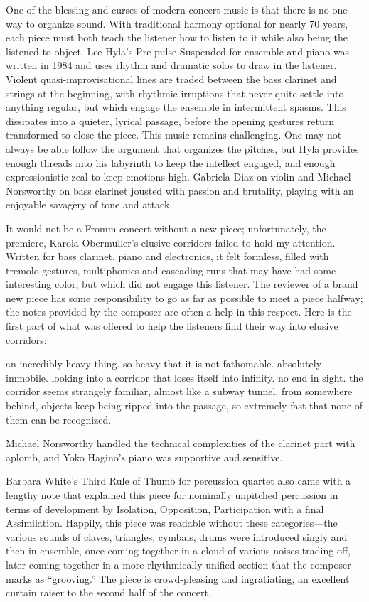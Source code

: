 One of the blessing and curses of modern concert music is that there is no one way to organize sound. With traditional harmony optional for nearly 70 years, each piece must both teach the listener how to listen to it while also being the listened-to object. Lee Hyla’s Pre-pulse Suspended for ensemble and piano was written in 1984 and uses rhythm and dramatic solos to draw in the listener. Violent quasi-improvisational lines are traded between the bass clarinet and strings at the beginning, with rhythmic irruptions that never quite settle into anything regular, but which engage the ensemble in intermittent spasms. This dissipates into a quieter, lyrical passage, before the opening gestures return transformed to close the piece. This music remains challenging. One may not always be able follow the argument that organizes the pitches, but Hyla provides enough threads into his labyrinth to keep the intellect engaged, and enough expressionistic zeal to keep emotions high. Gabriela Diaz on violin and Michael Norsworthy on bass clarinet jousted with passion and brutality, playing with an enjoyable savagery of tone and attack.

It would not be a Fromm concert without a new piece; unfortunately, the premiere, Karola Obermuller’s elusive corridors failed to hold my attention. Written for bass clarinet, piano and electronics, it felt formless, filled with tremolo gestures, multiphonics and cascading runs that may have had some interesting color, but which did not engage this listener. The reviewer of a brand new piece has some responsibility to go as far as possible to meet a piece halfway; the notes provided by the composer are often a help in this respect. Here is the first part of what was offered to help the listeners find their way into elusive corridors:

an incredibly heavy thing. so heavy that it is not fathomable. absolutely immobile. looking into a corridor that loses itself into infinity. no end in sight. the corridor seems strangely familiar, almost like a subway tunnel. from somewhere behind, objects keep being ripped into the passage, so extremely fast that none of them can be recognized.

Michael Norsworthy handled the technical complexities of the clarinet part with aplomb, and Yoko Hagino’s piano was supportive and sensitive.

Barbara White’s Third Rule of Thumb for percussion quartet also came with a lengthy note that explained this piece for nominally unpitched percussion in terms of development by Isolation, Opposition, Participation with a final Assimilation. Happily, this piece was readable without these categories—the various sounds of claves, triangles, cymbals, drums were introduced singly and then in ensemble, once coming together in a cloud of various noises trading off, later coming together in a more rhythmically unified section that the composer marks as “grooving.” The piece is crowd-pleasing and ingratiating, an excellent curtain raiser to the second half of the concert.

